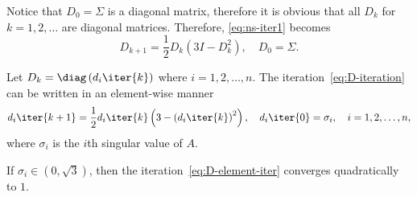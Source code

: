 \documentclass{article}
\numberwithin{equation}{section} %
\begin{document}
Notice that $D_0 = \Sigma$ is a diagonal matrix, therefore it is obvious
that all $D_k$ for $k = 1,2,\dots$ are diagonal matrices. Therefore,
\eqref{eq:ns-iter1} becomes
\begin{equation}
  \label{eq:D-iteration}
  D_{k+1} = \frac{1}{2}D_k(3I - D_k^2),\quad D_0 = \Sigma.
\end{equation}

Let $D_k = \diag\left(d_i\iter{k}\right)$ where $i=1,2,\dots,n$. The
iteration~\eqref{eq:D-iteration} can be written in an element-wise manner
\begin{equation}
  \label{eq:D-element-iter}
  d_i\iter{k+1} = \frac{1}{2}d_i\iter{k}\left(3-\left(d_i\iter{k}\right)^2\right),\quad d_i\iter{0} = \sigma_i, \quad i = 1,2,\dots,n,
\end{equation}
where $\sigma_i$ is the $i$th singular value of $A$.

\begin{lemma}\label{lemma:scalarNS}
If $\sigma_i\in (0,\sqrt{3})$, then the iteration~\eqref{eq:D-element-iter}
converges quadratically to $1$.
\end{lemma}
\end{document}
